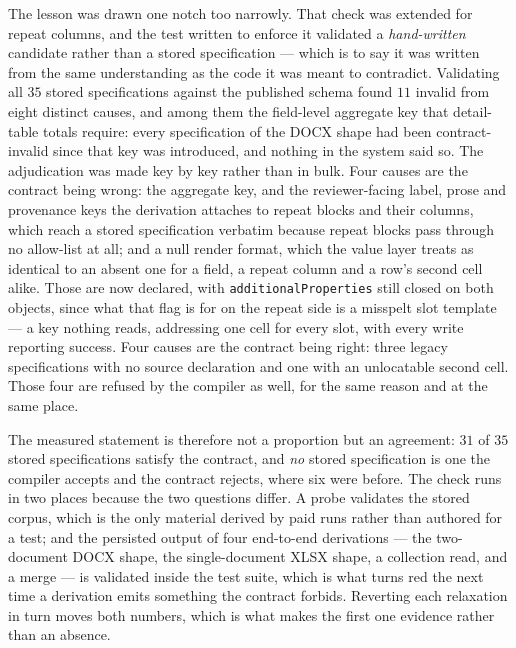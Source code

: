 The lesson was drawn one notch too narrowly. That check was extended for repeat columns,
and the test written to enforce it validated a \emph{hand-written} candidate rather than a
stored specification --- which is to say it was written from the same understanding as the
code it was meant to contradict. Validating all $35$ stored specifications against the
published schema found $11$ invalid from eight distinct causes, and among them the
field-level aggregate key that detail-table totals require: every specification of the DOCX
shape had been contract-invalid since that key was introduced, and nothing in the system
said so. The adjudication was made key by key rather than in bulk. Four causes are the
contract being wrong: the aggregate key, and the reviewer-facing label, prose and provenance
keys the derivation attaches to repeat blocks and their columns, which reach a stored
specification verbatim because repeat blocks pass through no allow-list at all; and a null
render format, which the value layer treats as identical to an absent one for a field, a
repeat column and a row's second cell alike. Those are now declared, with
\texttt{additionalProperties} still closed on both objects, since what that flag is for on
the repeat side is a misspelt slot template --- a key nothing reads, addressing one cell for
every slot, with every write reporting success. Four causes are the contract being right:
three legacy specifications with no source declaration and one with an unlocatable second
cell. Those four are refused by the compiler as well, for the same reason and at the same
place.

The measured statement is therefore not a proportion but an agreement: $31$ of $35$ stored
specifications satisfy the contract, and \emph{no} stored specification is one the compiler
accepts and the contract rejects, where six were before. The check runs in two places
because the two questions differ. A probe validates the stored corpus, which is the only
material derived by paid runs rather than authored for a test; and the persisted output of
four end-to-end derivations --- the two-document DOCX shape, the single-document XLSX shape,
a collection read, and a merge --- is validated inside the test suite, which is what turns
red the next time a derivation emits something the contract forbids. Reverting each
relaxation in turn moves both numbers, which is what makes the first one evidence rather
than an absence.

